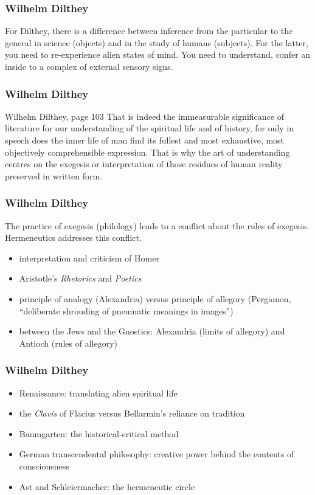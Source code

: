 \documentclass[xcolor=dvipsnames]{beamer}
\begin{document}
\begin{frame}
  \frametitle{Wilhelm Dilthey}
  For Dilthey, there is a difference between inference from the
  particular to the general in science (objects) and in the study of
  humans (subjects). For the latter, you need to re-experience alien
  states of mind. You need to \alert{understand}, confer an inside to
  a complex of external sensory signs.
\end{frame}

\begin{frame}
  \frametitle{Wilhelm Dilthey}
  \begin{block}{Wilhelm Dilthey, page 103}
    That is indeed the immeasurable significance of literature for our
    understanding of the spiritual life and of history, for only in
    speech does the inner life of man find its fullest and most
    exhaustive, most objectively comprehensible expression. That is
    why the art of understanding centres on the exegesis or
    interpretation of those residues of human reality preserved in
    written form.
  \end{block}
\end{frame}

\begin{frame}
  \frametitle{Wilhelm Dilthey}
  The practice of exegesis (philology) leads to a conflict about the
  rules of exegesis. Hermeneutics addresses this conflict.
  \begin{itemize}
  \item interpretation and criticism of Homer
  \item Aristotle's \emph{Rhetorics} and \emph{Poetics}
  \item principle of analogy (Alexandria) versus principle of allegory
    (Pergamon, ``deliberate shrouding of pneumatic meanings in images'')
  \item between the Jews and the Gnostics: Alexandria (limits of
    allegory) and Antioch (rules of allegory)
  \end{itemize} 
\end{frame}

\begin{frame}
  \frametitle{Wilhelm Dilthey}
  \begin{itemize}
  \item Renaissance: translating alien spiritual life
  \item the \emph{Clavis} of Flacius versus Bellarmin's reliance on
    tradition
  \item Baumgarten: the historical-critical method
  \item German transcendental philosophy: creative power behind the
    contents of consciousness
  \item Ast and Schleiermacher: the hermeneutic circle 
  \end{itemize} 
\end{frame}
\end{document}
